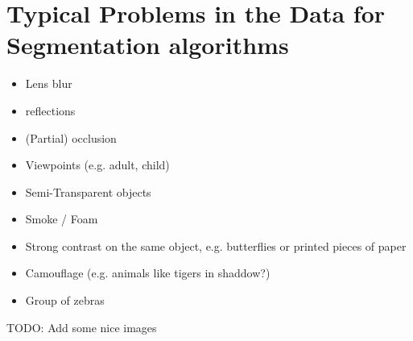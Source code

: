 \section{Typical Problems in the Data for Segmentation algorithms}

\begin{itemize}
    \item Lens blur
    \item reflections
    \item (Partial) occlusion
    \item Viewpoints (e.g. adult, child)
    \item Semi-Transparent objects
    \item Smoke / Foam
    \item Strong contrast on the same object, e.g. butterflies or printed
          pieces of paper
    \item Camouflage (e.g. animals like tigers in shaddow?)
    \item Group of zebras
\end{itemize}

TODO: Add some nice images

